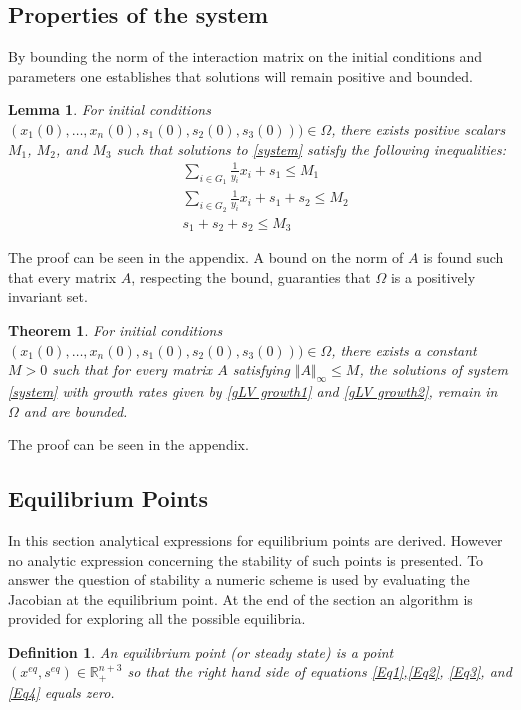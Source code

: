 \documentclass[3p,times]{elsarticle}
\newcommand{\R}{\mathbb{R}}
\newtheorem{defn}{Definition}
\newtheorem{lemma}{Lemma}
\newtheorem{theo}{Theorem}
\begin{document}
\subsection{Properties of the system}

By bounding the norm of the interaction matrix on the initial conditions and parameters one establishes that solutions will remain positive and bounded. 

\begin{lemma}
	\label{l1}
	For initial conditions $(x_1(0),\dots,x_n(0),s_1(0),s_2(0),s_3(0)))\in \Omega$, there exists positive scalars $M_1$, $M_2$, and $M_3$ such that solutions to \eqref{system} satisfy the following inequalities:
	\begin{align}
	&\sum \limits_{i \in G_1} \frac{1}{y_i}x_i + s_1 \leq M_1 \\
	&\sum \limits_{i \in G_2} \frac{1}{y_i}x_i + s_1 +s_2 \leq M_2 \\
	&s_1 + s_2 + s_2 \leq M_3
	\end{align}
\end{lemma}

The proof can be seen in the appendix. A bound on the norm of $A$ is found such that every matrix $A$, respecting the bound, guaranties that $\Omega$ is a positively invariant set.

\begin{theo}
	\label{theoWellPosedness}
	For initial conditions $(x_1(0),\dots,x_n(0),s_1(0),s_2(0),s_3(0)))\in \Omega$, there exists a constant $M>0$ such that for every matrix $A$ satisfying $\Vert A \Vert_{\infty} \leq M $, the solutions of system \eqref{system} with growth rates given by \eqref{gLV growth1} and \eqref{gLV growth2}, remain in $\Omega$ and are bounded.
\end{theo}

The proof can be seen in the appendix.

\subsection{Equilibrium Points}

In this section analytical expressions for equilibrium points are derived. However no analytic expression concerning the stability of such points is presented. To answer the question of stability a numeric scheme is used by evaluating the Jacobian at the equilibrium point. At the end of the section an algorithm is provided for exploring all the possible equilibria.

\begin{defn} 
	An equilibrium point (or steady state) is a point $(x^{eq},s^{eq}) \in \R^{n+3}_+$ so that the right hand side of equations \eqref{Eq1},\eqref{Eq2}, \eqref{Eq3}, and \eqref{Eq4} equals zero. 
\end{defn} 
\end{document}
